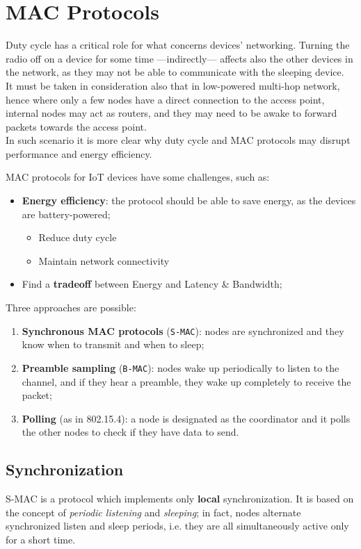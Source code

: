 \chapter{MAC Protocols}

Duty cycle has a critical role for what concerns devices' networking. Turning the radio off on a device for some time ---indirectly--- affects also the other devices in the network, as they may not be able to communicate with the sleeping device.\\
It must be taken in consideration also that in low-powered multi-hop network, hence where only a few nodes have a direct connection to the access point, internal nodes may act as routers, and they may need to be awake to forward packets towards the access point.\\
In such scenario it is more clear why duty cycle and MAC protocols may disrupt performance and energy efficiency.

MAC protocols for IoT devices have some challenges, such as:
\begin{itemize}
   \item \textbf{Energy efficiency}: the protocol should be able to save energy, as the devices are battery-powered;
   \begin{itemize}
      \item Reduce duty cycle
      \item Maintain network connectivity
   \end{itemize}
   \item Find a \textbf{tradeoff} between Energy and Latency \& Bandwidth;
\end{itemize}
Three approaches are possible:
\begin{enumerate}
   \item \textbf{Synchronous MAC protocols} (\texttt{S-MAC}): nodes are synchronized and they know when to transmit and when to sleep;
   \item \textbf{Preamble sampling} (\texttt{B-MAC}): nodes wake up periodically to listen to the channel, and if they hear a preamble, they wake up completely to receive the packet;
   \item \textbf{Polling} (as in 802.15.4): a node is designated as the coordinator and it polls the other nodes to check if they have data to send.
\end{enumerate}

\section{Synchronization}
S-MAC is a protocol which implements only \textbf{local} synchronization.
It is based on the concept of \textit{periodic listening} and \textit{sleeping}; in fact, nodes alternate synchronized listen and sleep periods, i.e. they are all simultaneously active only for a short time. 

